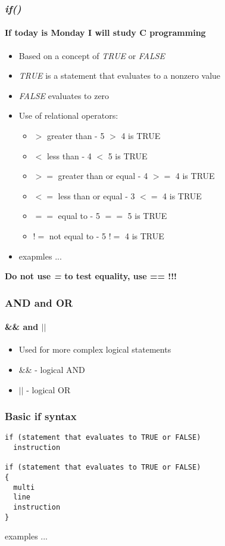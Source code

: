 \documentclass[10pt]{beamer}
\begin{document}
\begin{frame}
  \frametitle{\textit{if()}}
  \framesubtitle{If today is Monday I will study C programming}
  
  \begin{itemize}
    \item Based on a concept of \textit{TRUE} or \textit{FALSE}
    \item \textit{TRUE} is a statement that evaluates to a nonzero value
    \item \textit{FALSE} evaluates to zero
    \item Use of relational operators:
    \begin{itemize}
      \item $>$     greater than       -       5 $>$ 4 is TRUE
      \item $<$     less than           -      4 $<$ 5 is TRUE
      \item $>=$    greater than or equal -    4 $>=$ 4 is TRUE
      \item $<=$    less than or equal      -  3 $<=$ 4 is TRUE
      \item $==$    equal to               -   5 $==$ 5 is TRUE
      \item $!=$    not equal to            -  5 $!=$ 4 is TRUE
    \end{itemize}
    \item exapmles ...
  \end{itemize}
  \centering
  {\bf \color{red} \Large Do not use \textit{=} to test equality, use == !!!} 
\end{frame}

\begin{frame}
  \frametitle{AND and OR}
  \framesubtitle{\&\& and $||$}
  
  \begin{itemize}
    \item Used for more complex logical statements
    \item \&\& - logical AND
    \item $||$ - logical OR
  \end{itemize}
\end{frame}

\begin{frame}[fragile]
  \frametitle{Basic if syntax}
  
  \begin{lstlisting}
if (statement that evaluates to TRUE or FALSE)
  instruction
  
if (statement that evaluates to TRUE or FALSE)
{
  multi
  line
  instruction
}  
    \end{lstlisting}
    
    examples ...
\end{frame}
\end{document}
